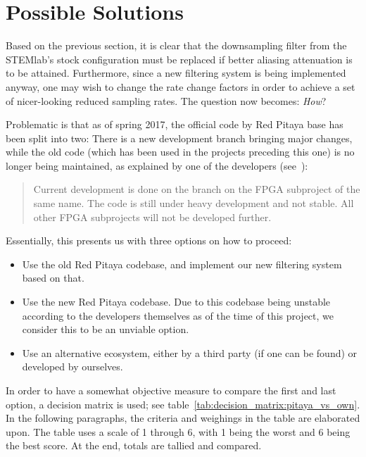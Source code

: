 


\section{Possible Solutions} %
\label{sec:mission:possible_solutions}

Based on the  previous section, it is clear that  the downsampling filter from
the  STEMlab's  stock  configuration  must  be  replaced  if  better  aliasing
attenuation is  to be attained. Furthermore,  since a new filtering  system is
being implemented  anyway, one may wish  to change the rate  change factors in
order to achieve  a set of nicer-looking reduced  sampling rates. The question
now becomes: \emph{How}?

Problematic is that  as of spring 2017,  the official code by  Red Pitaya base
has been  split into  two: There is  a new  development branch  bringing major
changes, while  the old code  (which has been  used in the  projects preceding
this one) is no longer being maintained, as explained by one of the developers
(see~\cite{pita:github:issue:huesser:jeras}):
\begin{quote}
    Current  development  is done  on  the   branch  on  the
    FPGA  subproject of  the same  name.  The  code is  still under  heavy
    development and  not stable. All  other FPGA  subprojects will  not be
    developed further.
\end{quote}

Essentially, this presents us with three options on how to proceed:
\begin{itemize}
    \item
        Use  the old  Red Pitaya  codebase,  and implement  our new  filtering
        system based  on that.
    \item
        Use the new  Red Pitaya codebase. Due to this  codebase being unstable
        according to the developers themselves as of the time of this project,
        we consider this to be an unviable option.
    \item
        Use an alternative  ecosystem, either by a third party  (if one can be
        found) or developed by ourselves.
\end{itemize}
In   order    to   have    a   somewhat    objective   measure    to   compare
the   first   and   last   option,    a   decision   matrix   is   used;   see
table~\ref{tab:decision_matrix:pitaya_vs_own}. In  the  following  paragraphs,
the criteria and weighings in the  table are elaborated upon. The table uses a
scale of  \num{1} through \num{6},  with \num{1}  being the worst  and \num{6}
being the best score. At the end, totals are tallied and compared.

